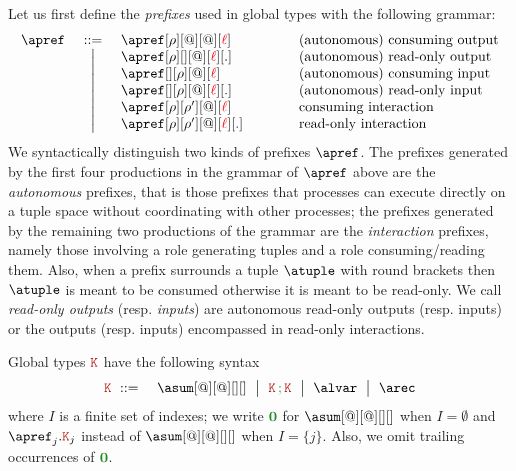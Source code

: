 %
Let us first define the \emph{prefixes} used in global types
with the following grammar:
%
\[\begin{array}{lcl@{\qquad\qquad}l}
  \apref & \bnfdef
  & \apref[\arole][@][@][\alocvar] & \text{(autonomous) consuming output}
  \\ & \bnfmid
  & \apref[\arole][{}][@][\alocvar][.] & \text{(autonomous) read-only output}
  \\ & \bnfmid
  & \apref[{}][\arole][@][\alocvar] & \text{(autonomous) consuming input}
  \\ & \bnfmid
  & \apref[{}][\arole][@][\alocvar][.] & \text{(autonomous) read-only input}
  \\ & \bnfmid
  & \apref[\arole][\arole'][@][\alocvar] & \text{consuming interaction}
  \\ & \bnfmid
  & \apref[\arole][\arole'][@][\alocvar][.]  & \text{read-only interaction}
  \end{array}
\]
%
We syntactically distinguish two kinds of prefixes $\apref$.
%
The prefixes generated by the first four productions in the grammar of
$\apref$ above are the \emph{autonomous} prefixes, that is those
prefixes that processes can execute directly on a tuple space without
coordinating with other processes; the prefixes generated by the
remaining two productions of the grammar are the \emph{interaction}
prefixes, namely those involving a role generating tuples and a role
consuming/reading them.
%
Also, when a prefix surrounds a tuple $\atuple$ with round brackets
then $\atuple$ is meant to be consumed otherwise it is meant to be
read-only.
%
We call \emph{read-only outputs} (resp. \emph{inputs}) are autonomous
read-only outputs (resp. inputs) or the outputs (resp. inputs)
encompassed in read-only interactions.

Global types $\aK$ have the following syntax
\begin{eqnarray*}
  \aK & \bnfdef & \asum[@][@][][]
                  \bnfmid
                  \aK \seqop \aK \bnfmid
                  \alvar \bnfmid
                  \arec
\end{eqnarray*}
where $I$ is a finite set of indexes; we write $\nil$ for
$\asum[@][@][][]$ when $I = \emptyset$ and $\apref_j.\aK_j$ instead of
$\asum[@][@][][]$ when $I = \{j\}$.
%
Also, we omit trailing occurrences of $\nil$.

